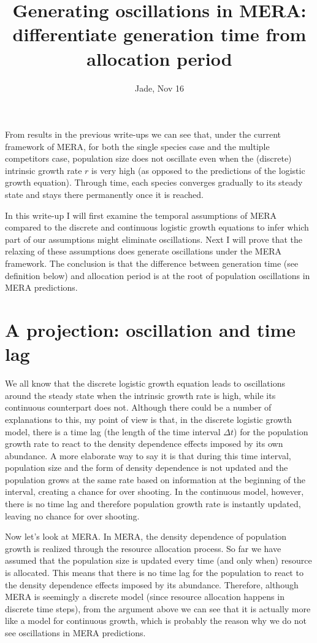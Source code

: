 \documentclass[12pt]{article}
\date{}
\title{\Large \textbf{Generating oscillations in MERA: differentiate generation time from allocation period}}
\author{Jade, Nov 16}
\begin{document}
\maketitle
\raggedright
\large
\setlength{\parindent}{15pt}

From results in the previous write-ups we can see that, under the current framework of MERA, for both the single species case and the multiple competitors case, population size does not oscillate even when the (discrete) intrinsic growth rate $r$ is very high (as opposed to the predictions of the logistic growth equation). Through time, each species converges gradually to its steady state and stays there permanently once it is reached. 

In this write-up I will first examine the temporal assumptions of MERA compared to the discrete and continuous logistic growth equations to infer which part of our assumptions might eliminate oscillations. Next I will prove that the relaxing of these assumptions does generate oscillations under the MERA framework. The conclusion is that the difference between generation time (see definition below) and allocation period is at the root of population oscillations in MERA predictions.

\section{A projection: oscillation and time lag}

We all know that the discrete logistic growth equation leads to oscillations around the steady state when the intrinsic growth rate is high, while its continuous counterpart does not. Although there could be a number of explanations to this, my point of view is that, in the discrete logistic growth model, there is a time lag (the length of the time interval $\Delta t$) for the population growth rate to react to the density dependence effects imposed by its own abundance. A more elaborate way to say it is that during this time interval, population size and the form of density dependence is not updated and the population grows at the same rate based on information at the beginning of the interval, creating a chance for over shooting. In the continuous model, however, there is no time lag and therefore population growth rate is instantly updated, leaving no chance for over shooting. 

Now let's look at MERA. In MERA, the density dependence of population growth is realized through the resource allocation process. So far we have assumed that the population size is updated every time (and only when) resource is allocated. This means that there is no time lag for the population to react to the density dependence effects imposed by its abundance. Therefore, although MERA is seemingly a discrete model (since resource allocation happens in discrete time steps), from the argument above we can see that it is actually more like a model for continuous growth, which is probably the reason why we do not see oscillations in MERA predictions. 
\end{document}
